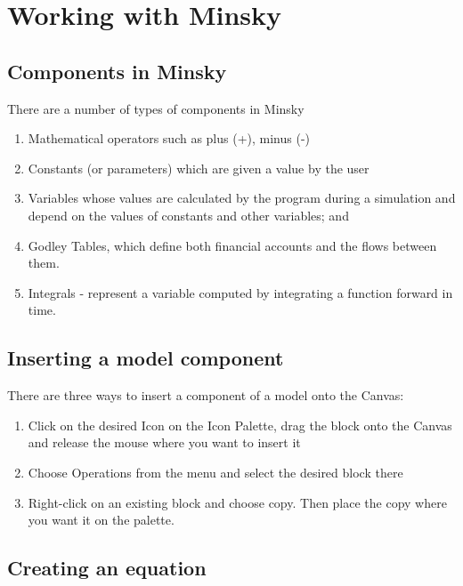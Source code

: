 \section{Working with Minsky}

\subsection{Components in Minsky}

There are a number of types of components in Minsky
\begin{enumerate}
\item Mathematical operators such as plus (+), minus (-)
\item Constants (or parameters) which are given a value by the user
\item Variables whose values are calculated by the program during a simulation and depend on the values of constants and other variables; and
\item Godley Tables, which define both financial accounts and the
flows between them.
\item Integrals - represent a variable computed by integrating a
function forward in time.
\end{enumerate}


\subsection{Inserting a model component}


There are three ways to insert a component of a model onto the Canvas:
\begin{enumerate}
\item Click on the desired Icon on the Icon Palette, drag the block
onto the Canvas and release the mouse where you want to insert it 


\item Choose Operations from the menu and select the desired block there


\item Right-click on an existing block and choose copy. Then place the
copy where you want it on the palette. 



\end{enumerate}

\subsection{Creating an equation}

